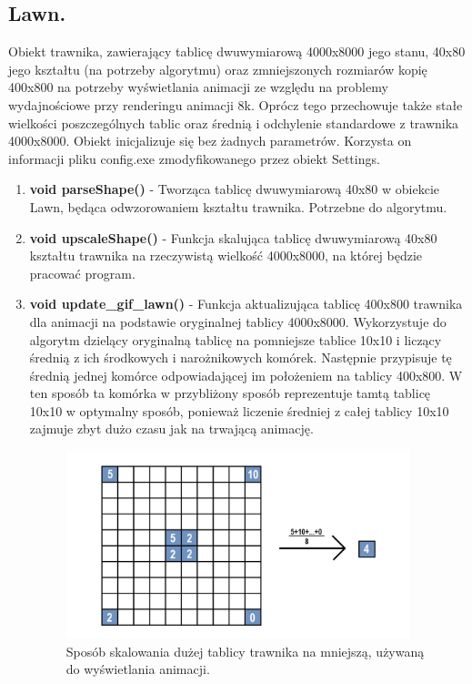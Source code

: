 \documentclass[a4paper]{article}
\begin{document}
\subsection{Lawn.}
Obiekt trawnika, zawierający tablicę dwuwymiarową 4000x8000 jego stanu, 40x80 jego kształtu (na potrzeby algorytmu) oraz zmniejszonych rozmiarów kopię 400x800 na potrzeby wyświetlania animacji ze względu na problemy wydajnościowe przy renderingu animacji 8k. Oprócz tego przechowuje także stałe wielkości poszczególnych tablic oraz średnią i odchylenie standardowe z trawnika 4000x8000.
\newline Obiekt inicjalizuje się bez żadnych parametrów. Korzysta on informacji pliku config.exe zmodyfikowanego przez obiekt Settings. 
\begin{enumerate}
    	\item \textbf{void parseShape()} - Tworząca tablicę dwuwymiarową 40x80 w obiekcie Lawn, będąca odwzorowaniem kształtu trawnika. Potrzebne do algorytmu. 
    	\item \textbf{void upscaleShape()} - Funkcja skalująca tablicę dwuwymiarową 40x80 kształtu trawnika na rzeczywistą wielkość 4000x8000, na której będzie pracować program.
    	\item \textbf{void update\_gif\_lawn()} - Funkcja aktualizująca tablicę 400x800 trawnika dla animacji na podstawie oryginalnej tablicy 4000x8000. Wykorzystuje do algorytm dzielący oryginalną tablicę na pomniejsze tablice 10x10 i liczący średnią z ich środkowych i narożnikowych komórek. Następnie przypisuje tę średnią jednej komórce odpowiadającej im położeniem na tablicy 400x800. W ten sposób ta komórka w przybliżony sposób reprezentuje tamtą tablicę 10x10 w optymalny sposób, ponieważ liczenie średniej z całej tablicy 10x10 zajmuje zbyt dużo czasu jak na trwającą animację.

\begin{figure}[H]
    \includegraphics[width=10cm]{parse_gif.png}
    \centering
    \caption{Sposób skalowania dużej tablicy trawnika na mniejszą, używaną do wyświetlania animacji.}
\end{figure}


\end{enumerate}
\end{document}

